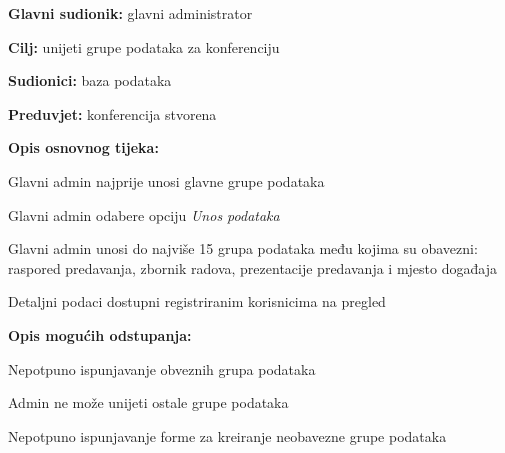      					\noindent {}
					\begin{packed_item}
	
						\item \textbf{Glavni sudionik: } glavni administrator
						\item  \textbf{Cilj:} unijeti grupe podataka za konferenciju
						\item  \textbf{Sudionici:} baza podataka
						\item  \textbf{Preduvjet:} konferencija stvorena
						\item  \textbf{Opis osnovnog tijeka:}
						
						\item[] \begin{packed_enum}

                                \item Glavni admin najprije unosi glavne grupe podataka
							\item Glavni admin odabere opciju \textit{Unos podataka}
							\item Glavni admin unosi do najviše 15 grupa podataka među kojima su obavezni: raspored predavanja, zbornik radova, prezentacije predavanja i mjesto događaja
							\item Detaljni podaci dostupni registriranim korisnicima na pregled
						\end{packed_enum}
						
						\item  \textbf{Opis mogućih odstupanja:}
						
						\item[] \begin{packed_item}
	
							\item[1.] Nepotpuno ispunjavanje obveznih grupa podataka
							\item[] \begin{packed_enum}
								
								\item Admin ne može unijeti ostale grupe podataka

                                    \end{packed_enum}
                                \item[2.] Nepotpuno ispunjavanje forme za kreiranje neobavezne grupe podataka
							\item[] \begin{packed_enum}
								

\end{packed_enum}
\end{packed_item}
\end{packed_item}
